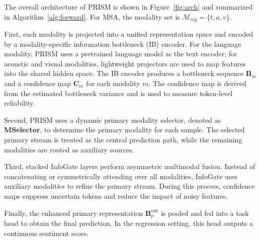 \documentclass[11pt]{article}
\begin{document}
The overall architecture of PRISM is shown in Figure~\ref{fig:arch} and
summarized in Algorithm~\ref{alg:forward}. For MSA, the modality set is
$\mathcal{M}_{\mathrm{reg}}=\{t,a,v\}$.

First, each modality is projected into a unified representation space and
encoded by a modality-specific information bottleneck (IB) encoder. For the
language modality, PRISM uses a pretrained language model as the text encoder;
for acoustic and visual modalities, lightweight projectors are used to map
features into the shared hidden space. The IB encoder produces a bottleneck
sequence $\mathbf{B}_m$ and a confidence map $\mathbf{C}_m$ for each modality
$m$. The confidence map is derived from the estimated bottleneck variance and
is used to measure token-level reliability.

Second, PRISM uses a dynamic primary modality selector, denoted as
\textbf{MSelector}, to determine the primary modality for each sample. The
selected primary stream is treated as the central prediction path, while the
remaining modalities are routed as auxiliary sources.

Third, stacked InfoGate layers perform asymmetric multimodal fusion. Instead
of concatenating or symmetrically attending over all modalities, InfoGate uses
auxiliary modalities to refine the primary stream. During this process,
confidence maps suppress uncertain tokens and reduce the impact of noisy
features.

Finally, the enhanced primary representation
$\mathbf{B}_p^{\mathrm{out}}$ is pooled and fed into a task head to obtain the
final prediction. In the regression setting, this head outputs a continuous
sentiment score.
\end{document}
